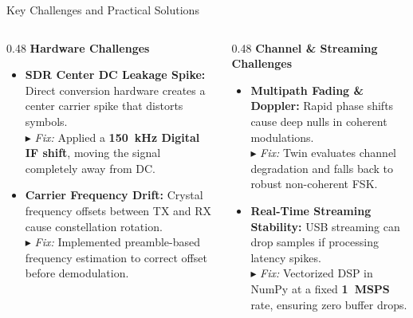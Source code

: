 \documentclass[aspectratio=169, 10pt]{beamer}
\begin{document}
\begin{frame}{Key Challenges and Practical Solutions}
  \begin{columns}[T]
    \begin{column}{0.48\linewidth}
      \textbf{\color{primaryblue}\normalsize Hardware Challenges}\\[0.10cm]
      \begin{itemize}\setlength{\itemsep}{8pt}\small
        \item \textbf{SDR Center DC Leakage Spike:} Direct conversion hardware creates a center carrier spike that distorts symbols.\\
        $\blacktriangleright$ \textit{Fix:} Applied a \textbf{150~kHz Digital IF shift}, moving the signal completely away from DC.
        \item \textbf{Carrier Frequency Drift:} Crystal frequency offsets between TX and RX cause constellation rotation.\\
        $\blacktriangleright$ \textit{Fix:} Implemented preamble-based frequency estimation to correct offset before demodulation.
      \end{itemize}
    \end{column}
    
    \begin{column}{0.48\linewidth}
      \textbf{\color{primaryblue}\normalsize Channel \& Streaming Challenges}\\[0.10cm]
      \begin{itemize}\setlength{\itemsep}{8pt}\small
        \item \textbf{Multipath Fading \& Doppler:} Rapid phase shifts cause deep nulls in coherent modulations.\\
        $\blacktriangleright$ \textit{Fix:} Twin evaluates channel degradation and falls back to robust non-coherent FSK.
        \item \textbf{Real-Time Streaming Stability:} USB streaming can drop samples if processing latency spikes.\\
        $\blacktriangleright$ \textit{Fix:} Vectorized DSP in NumPy at a fixed \textbf{1~MSPS} rate, ensuring zero buffer drops.
      \end{itemize}
    \end{column}
  \end{columns}
\end{frame}
\end{document}
